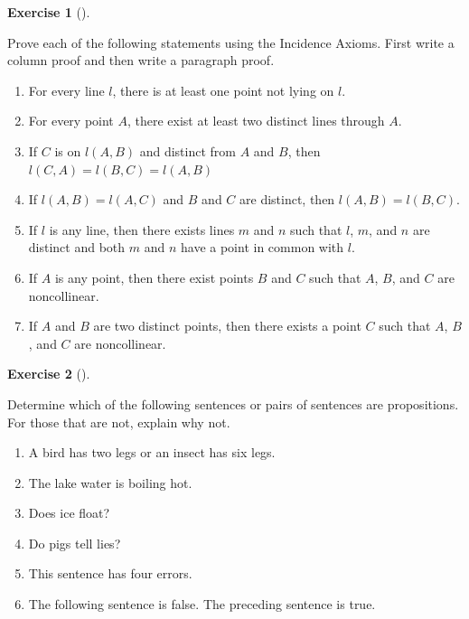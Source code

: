 \documentclass[
  letterpaper,
  10pt,
  reqno,
  twopage,
  openany]{book}
\providecommand{\tightlist}{%
  \setlength{\itemsep}{0pt}\setlength{\parskip}{0pt}}\usepackage{longtable,booktabs,array}
\theoremstyle{plain}
\theoremstyle{definition}
\newtheorem{exercise}{Exercise}[chapter]
\theoremstyle{definition}
\theoremstyle{definition}
\theoremstyle{plain}
\theoremstyle{plain}
\theoremstyle{remark}
\begin{document}
\leavevmode{}%
\begin{exercise}[]\label{exr-incidence3}

Prove each of the following statements using the Incidence Axioms. First
write a column proof and then write a paragraph proof.

\begin{enumerate}
\def\labelenumi{\arabic{enumi}.}
\tightlist
\item
  For every line \(l\), there is at least one point not lying on \(l\).
\item
  For every point \(A\), there exist at least two distinct lines through
  \(A.\)
\item
  If \(C\) is on \(l(A,B)\) and distinct from \(A\) and \(B\), then
  \(l(C,A) = l(B,C) = l(A,B)\)
\item
  If \(l(A,B) = l(A,C)\) and \(B\) and \(C\) are distinct, then
  \(l(A,B) = l(B,C)\).
\item
  If \(l\) is any line, then there exists lines \(m\) and \(n\) such
  that \(l\), \(m\), and \(n\) are distinct and both \(m\) and \(n\)
  have a point in common with \(l\).
\item
  If \(A\) is any point, then there exist points \(B\) and \(C\) such
  that \(A\), \(B\), and \(C\) are noncollinear.
\item
  If \(A\) and \(B\) are two distinct points, then there exists a point
  \(C\) such that \(A\), \(B\), and \(C\) are noncollinear.
\end{enumerate}

\end{exercise}

\leavevmode{}%
\begin{exercise}[]\label{exr-propositions}

Determine which of the following sentences or pairs of sentences are
propositions. For those that are not, explain why not.

\begin{enumerate}
\def\labelenumi{\arabic{enumi}.}
\tightlist
\item
  A bird has two legs or an insect has six legs.
\item
  The lake water is boiling hot.
\item
  Does ice float?
\item
  Do pigs tell lies?
\item
  This sentence has four errors.
\item
  The following sentence is false. The preceding sentence is true.
\end{enumerate}

\end{exercise}
\end{document}

